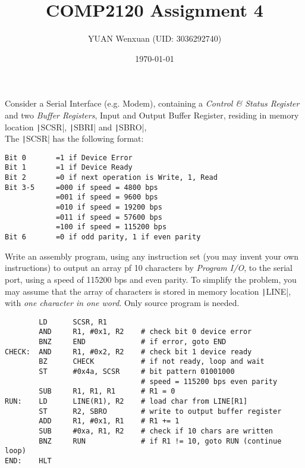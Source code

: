 \documentclass[answers]{exam}
\title{COMP2120 Assignment 4}
\author{YUAN Wenxuan (UID: 3036292740)}
\date{\today}
\begin{document}
\maketitle
\begin{questions}

    \question Consider a Serial Interface (e.g. Modem),
    containing a \textit{Control \& Status Register} and two \textit{Buffer Registers}, Input and Output Buffer Register,
    residing in memory location \texttt|SCSR|, \texttt|SBRI| and \texttt|SBRO|, \\
    The \texttt|SCSR| has the following format:

    \begin{verbatim}
Bit 0       =1 if Device Error
Bit 1       =1 if Device Ready
Bit 2       =0 if next operation is Write, 1, Read
Bit 3-5     =000 if speed = 4800 bps
            =001 if speed = 9600 bps
            =010 if speed = 19200 bps
            =011 if speed = 57600 bps
            =100 if speed = 115200 bps
Bit 6       =0 if odd parity, 1 if even parity
    \end{verbatim}

    Write an assembly program, using any instruction set (you may invent your own instructions) to output an array pf 10 characters by \textit{Program I/O}, to the serial port, using a speed of 115200 bps and even parity.
    To simplify the problem, you may assume that the array of characters is stored in memory location \texttt|LINE|, with \textit{one character in one word}.
    Only source program is needed.

    \begin{solution}
        \begin{verbatim}
        LD      SCSR, R1
        AND     R1, #0x1, R2    # check bit 0 device error
        BNZ     END             # if error, goto END
CHECK:  AND     R1, #0x2, R2    # check bit 1 device ready
        BZ      CHECK           # if not ready, loop and wait
        ST      #0x4a, SCSR     # bit pattern 01001000 
                                # speed = 115200 bps even parity
        SUB     R1, R1, R1      # R1 = 0
RUN:    LD      LINE(R1), R2    # load char from LINE[R1]
        ST      R2, SBRO        # write to output buffer register
        ADD     R1, #0x1, R1    # R1 += 1
        SUB     #0xa, R1, R2    # check if 10 chars are written
        BNZ     RUN             # if R1 != 10, goto RUN (continue loop)
END:    HLT
        \end{verbatim}
    \end{solution}


\end{questions}
\end{document}
